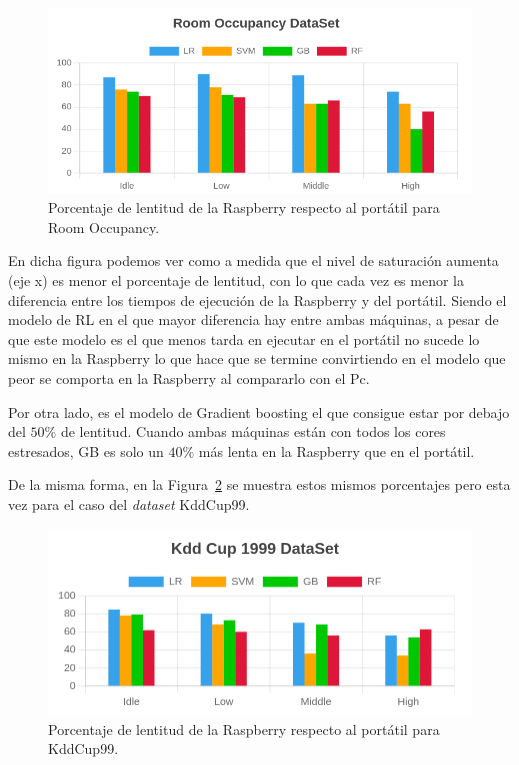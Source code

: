 \documentclass[a4paper, 12pt]{book}
\begin{document}
\begin{figure}[]
  \centering
  \includegraphics[width=14cm, keepaspectratio]{img/per_occupancy.png}
  \caption{Porcentaje de lentitud de la Raspberry respecto al portátil para Room Occupancy.}
  \label{fig:per_occupancy}
\end{figure}

En dicha figura podemos ver como a medida que el nivel de saturación aumenta (eje x) es menor el porcentaje de lentitud, con lo que cada vez es menor la diferencia entre los tiempos de ejecución de la Raspberry y del portátil. Siendo el modelo de RL en el que mayor diferencia hay entre ambas máquinas, a pesar de que este modelo es el que menos tarda en ejecutar en el portátil no sucede lo mismo en la Raspberry lo que hace que se termine convirtiendo en el modelo que peor se comporta en la Raspberry al compararlo con el Pc.

Por otra lado, es el modelo de Gradient boosting el que consigue estar por debajo del $50\%$ de lentitud. Cuando ambas máquinas están con todos los cores estresados, GB es solo un $40\%$ más lenta en la Raspberry que en el portátil.

De la misma forma, en la Figura~\ref{fig:per_kdd} se muestra estos mismos porcentajes pero esta vez para el caso del \textit{dataset} KddCup99.

\begin{figure}[]
  \centering
  \includegraphics[width=14cm, keepaspectratio]{img/per_kdd.png}
  \caption{Porcentaje de lentitud de la Raspberry respecto al portátil para KddCup99.}
  \label{fig:per_kdd}
\end{figure}
\end{document}
